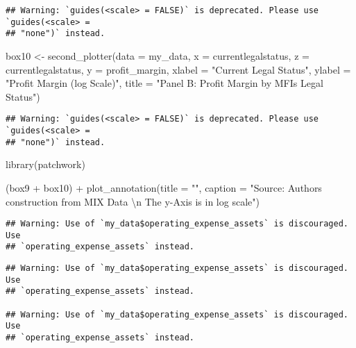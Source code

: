\documentclass[a4paper,nobind]{templates/ociamthesis}
\newenvironment{Shaded}{\begin{snugshade}}{\end{snugshade}}
\newcommand{\AttributeTok}[1]{\textcolor[rgb]{0.77,0.63,0.00}{#1}}
\newcommand{\FunctionTok}[1]{\textcolor[rgb]{0.00,0.00,0.00}{#1}}
\newcommand{\NormalTok}[1]{#1}
\newcommand{\OtherTok}[1]{\textcolor[rgb]{0.56,0.35,0.01}{#1}}
\newcommand{\SpecialCharTok}[1]{\textcolor[rgb]{0.00,0.00,0.00}{#1}}
\newcommand{\StringTok}[1]{\textcolor[rgb]{0.31,0.60,0.02}{#1}}
\renewenvironment{Shaded}
{
  \vspace{10pt}%
  \begin{snugshade}%
}{%
  \end{snugshade}%
  \vspace{8pt}%
}
\begin{document}
\begin{landscape}
\begin{verbatim}
## Warning: `guides(<scale> = FALSE)` is deprecated. Please use `guides(<scale> =
## "none")` instead.
\end{verbatim}

\begin{Shaded}
\begin{Highlighting}[]
\NormalTok{box10 }\OtherTok{\textless{}{-}} \FunctionTok{second\_plotter}\NormalTok{(}\AttributeTok{data =}\NormalTok{ my\_data, }\AttributeTok{x =}\NormalTok{ currentlegalstatus, }
        \AttributeTok{z =}\NormalTok{ currentlegalstatus,}
        \AttributeTok{y =}\NormalTok{ profit\_margin, }
        \AttributeTok{xlabel =} \StringTok{"Current Legal Status"}\NormalTok{, }
        \AttributeTok{ylabel =} \StringTok{"Profit Margin (log Scale)"}\NormalTok{, }
        \AttributeTok{title =} \StringTok{"Panel B: Profit Margin by MFIs Legal Status"}\NormalTok{)}
\end{Highlighting}
\end{Shaded}

\begin{verbatim}
## Warning: `guides(<scale> = FALSE)` is deprecated. Please use `guides(<scale> =
## "none")` instead.
\end{verbatim}

\begin{Shaded}
\begin{Highlighting}[]
\FunctionTok{library}\NormalTok{(patchwork)}

\NormalTok{(box9 }\SpecialCharTok{+}\NormalTok{ box10) }\SpecialCharTok{+} \FunctionTok{plot\_annotation}\NormalTok{(}\AttributeTok{title =} \StringTok{""}\NormalTok{, }\AttributeTok{caption =} \StringTok{"Source: Authors\textquotesingle{} construction from MIX Data }\SpecialCharTok{\textbackslash{}n}
\StringTok{                                                The y{-}Axis is in log scale"}\NormalTok{)}
\end{Highlighting}
\end{Shaded}

\begin{verbatim}
## Warning: Use of `my_data$operating_expense_assets` is discouraged. Use
## `operating_expense_assets` instead.
\end{verbatim}

\begin{verbatim}
## Warning: Use of `my_data$operating_expense_assets` is discouraged. Use
## `operating_expense_assets` instead.

## Warning: Use of `my_data$operating_expense_assets` is discouraged. Use
## `operating_expense_assets` instead.


\end{verbatim}
\end{landscape}
\end{document}
